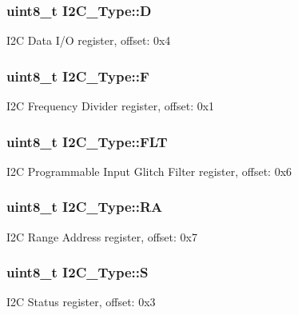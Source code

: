 \subsubsection[{\texorpdfstring{D}{D}}]{ uint8\+\_\+t I2\+C\+\_\+\+Type\+::D}\hypertarget{structI2C__Type_a545035e76e1c914229d2a60cce227fa0}{}\label{structI2C__Type_a545035e76e1c914229d2a60cce227fa0}
I2C Data I/O register, offset\+: 0x4 
\subsubsection[{\texorpdfstring{F}{F}}]{ uint8\+\_\+t I2\+C\+\_\+\+Type\+::F}\hypertarget{structI2C__Type_a4b1063d3e6b714b02cbcbf2e51a51f20}{}\label{structI2C__Type_a4b1063d3e6b714b02cbcbf2e51a51f20}
I2C Frequency Divider register, offset\+: 0x1 
\subsubsection[{\texorpdfstring{F\+LT}{FLT}}]{ uint8\+\_\+t I2\+C\+\_\+\+Type\+::\+F\+LT}\hypertarget{structI2C__Type_ad1329971804f2071ee4684b0513b7cfc}{}\label{structI2C__Type_ad1329971804f2071ee4684b0513b7cfc}
I2C Programmable Input Glitch Filter register, offset\+: 0x6 
\subsubsection[{\texorpdfstring{RA}{RA}}]{ uint8\+\_\+t I2\+C\+\_\+\+Type\+::\+RA}\hypertarget{structI2C__Type_a6e1b24826eb462af336d49e3a1b9f8db}{}\label{structI2C__Type_a6e1b24826eb462af336d49e3a1b9f8db}
I2C Range Address register, offset\+: 0x7 
\subsubsection[{\texorpdfstring{S}{S}}]{ uint8\+\_\+t I2\+C\+\_\+\+Type\+::S}\hypertarget{structI2C__Type_a162318256d0b1b10410f02ffee1faeb3}{}\label{structI2C__Type_a162318256d0b1b10410f02ffee1faeb3}
I2C Status register, offset\+: 0x3 
